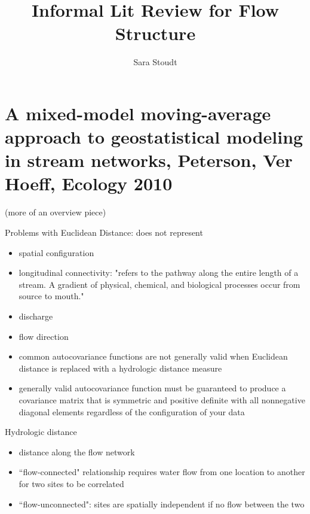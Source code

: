 \documentclass[12pt]{amsart}
\title{Informal Lit Review for Flow Structure}
\author{Sara Stoudt}
\begin{document}
\maketitle

\section{A mixed-model moving-average approach to geostatistical modeling
in stream networks, Peterson, Ver Hoeff, Ecology 2010}

(more of an overview piece)

Problems with Euclidean Distance:  does not represent 
\begin{itemize}
\item spatial configuration
\item longitudinal connectivity: "refers to the pathway along the entire length of a stream. A gradient of physical, chemical, and biological processes occur from source to mouth."
\item discharge
\item flow direction
\item common autocovariance functions are not generally valid when Euclidean distance is replaced with a hydrologic distance measure
\item generally valid autocovariance function must be guaranteed to produce a covariance matrix that is symmetric and positive definite with all nonnegative diagonal elements regardless of the configuration of your data
\end{itemize}

Hydrologic distance
\begin{itemize}
\item distance along the flow network
\item ``flow-connected" relationship requires water flow from one location to another for two sites to be correlated
\item ``flow-unconnected": sites are spatially independent if no flow between the two
\end{itemize}
\end{document}
